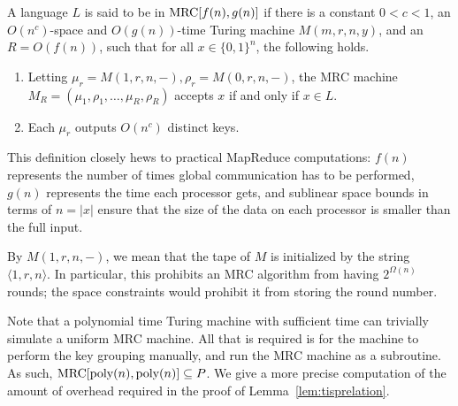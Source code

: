 \documentclass{llncs}
\newcommand{\mrc}{\textup{MRC}}
\begin{document}
\begin{definition}

A language $L$ is said to be in $\mrc[f(n),g(n)]$ if there is a constant $0 < c
< 1$, an $O(n^c)$-space and $O(g(n))$-time Turing machine $M(m, r, n, y)$, and
an $R = O(f(n))$, such that for all $x \in \{ 0,1 \}^n$, the following holds.

\begin{enumerate}
\item Letting $\mu_r = M(1, r, n, -), \rho_r = M(0, r, n, -)$, the MRC machine
$M_R = (\mu_1, \rho_1, \dots, \mu_R, \rho_R)$ accepts $x$ if and only if $x \in
L$.

\item Each $\mu_r$ outputs $O(n^c)$ distinct keys.
\end{enumerate}

\end{definition}

This definition closely hews to practical MapReduce computations:  $f(n)$
represents the number of times global communication has to be performed, $g(n)$
represents the  time each processor gets, and sublinear space bounds in terms of $n =
|x|$ ensure that the size of the data on each processor is smaller than the
full input.

\begin{remark}
By $M(1, r, n, -)$, we mean that the tape of $M$ is initialized by the string
$\langle 1, r, n \rangle$. In particular, this prohibits an MRC algorithm from
having $2^{\Omega(n)}$ rounds; the space constraints would prohibit it from
storing the round number.
\end{remark}

\begin{remark}\label{remark:timebound}
Note that a polynomial time Turing machine with sufficient time can trivially
simulate a uniform MRC machine. All that is required is for the machine to
perform the key grouping manually, and run the MRC machine as a subroutine. As
such, $\mrc[\text{poly}(n), \text{poly}(n)] \subseteq P$. We give a more precise
computation of the amount of overhead required in the proof of
Lemma~\ref{lem:tisprelation}.
\end{remark}

\end{document}
